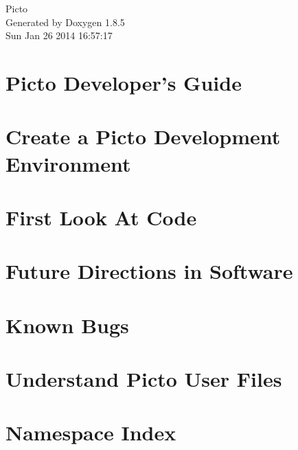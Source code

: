 \documentclass[twoside]{book}
\newcommand{\clearemptydoublepage}{%
  \newpage{\pagestyle{empty}\cleardoublepage}%
}
\begin{document}
\hypersetup{pageanchor=false}
\begin{titlepage}
\vspace*{7cm}
\begin{center}%
{\Large Picto }\\
\vspace*{1cm}
{\large Generated by Doxygen 1.8.5}\\
\vspace*{0.5cm}
{\small Sun Jan 26 2014 16:57:17}\\
\end{center}
\end{titlepage}
\clearemptydoublepage
\tableofcontents
\clearemptydoublepage
{}
\hypersetup{pageanchor=true}

\chapter{Picto Developer's Guide}
\label{index}\hypertarget{index}{}
\chapter{Create a Picto Development Environment}
\label{build_environment_preparation}
\hypertarget{build_environment_preparation}{}

\chapter{First Look At Code}
\label{first_code_look}
\hypertarget{first_code_look}{}

\chapter{Future Directions in Software}
\label{future_directions_software}
\hypertarget{future_directions_software}{}

\chapter{Known Bugs}
\label{known_bugs}
\hypertarget{known_bugs}{}

\chapter{Understand Picto User Files}
\label{user_files}
\hypertarget{user_files}{}

\chapter{Namespace Index}

\end{document}

